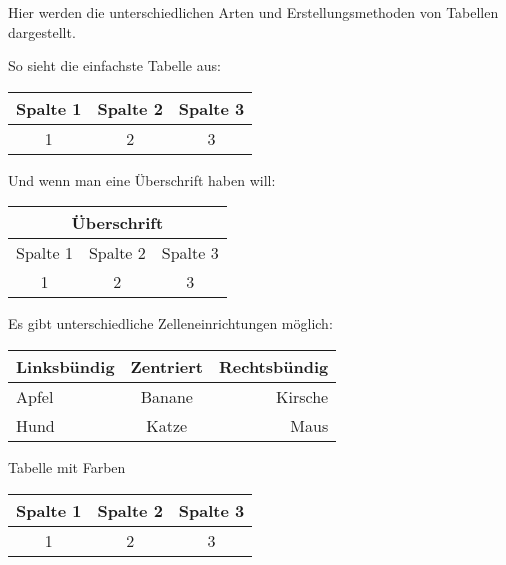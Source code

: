 \documentclass[a4paper, 12pt]{article}
\begin{document}
Hier werden die unterschiedlichen Arten und Erstellungsmethoden von Tabellen dargestellt.

So sieht die einfachste Tabelle aus:

\begin{tabular}{|c|c|c|}
\hline
Spalte 1 & Spalte 2 & Spalte 3 \\
\hline
1 & 2 & 3 \\
\hline
\end{tabular}

Und wenn man eine Überschrift haben will:

\begin{tabular}{|c|c|c|}
\hline
\multicolumn{3}{|c|}{Überschrift}\\
\hline
Spalte 1 & Spalte 2 & Spalte 3 \\
\hline
1 & 2 & 3 \\
\hline
\end{tabular}

Es gibt unterschiedliche Zelleneinrichtungen möglich:

\begin{tabular}{|l|c|r|}
    \hline
    Linksbündig & Zentriert & Rechtsbündig \\
    \hline
    Apfel & Banane & Kirsche \\
    \hline
    Hund & Katze & Maus \\
    \hline
\end{tabular}

Tabelle mit Farben

\begin{tabular}{|c|c|c|}
\hline
\rowcolor{blue!25}
Spalte 1 & Spalte 2 & Spalte 3 \\
\hline
1 & 2 & 3 \\
\hline
\end{tabular}
\end{document}
